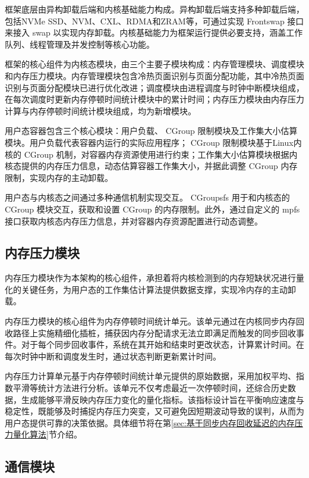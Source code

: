 框架底层由异构卸载后端和内核基础能力构成。异构卸载后端支持多种卸载后端，包括NVMe SSD、NVM、CXL、RDMA和ZRAM等，可通过实现 Frontswap 接口来接入 swap 以实现内存卸载。内核基础能力为框架运行提供必要支持，涵盖工作队列、线程管理及并发控制等核心功能。

框架的核心组件为内核态模块，由三个主要子模块构成：内存管理模块、调度模块和内存压力模块。内存管理模块包含冷热页面识别与页面分配功能，其中冷热页面识别与页面分配模块已进行优化改进；调度模块由进程调度与时钟中断模块组成，在每次调度时更新内存停顿时间统计模块中的累计时间；内存压力模块由内存压力计算与内存停顿时间统计模块组成，均为新增模块。

用户态容器包含三个核心模块：用户负载、 CGroup 限制模块及工作集大小估算模块。用户负载代表容器内运行的实际应用程序； CGroup 限制模块基于Linux内核的 CGroup 机制，对容器内存资源使用进行约束；工作集大小估算模块根据内核态提供的内存压力信息，动态估算容器工作集大小，并据此调整 CGroup 内存限制，实现内存的主动卸载。

用户态与内核态之间通过多种通信机制实现交互。 CGroupsfs 用于和内核态的 CGroup 模块交互，获取和设置 CGroup 的内存限制。此外，通过自定义的 mpfs 接口获取内核态内存压力信息，并对容器内存资源配置进行动态调整。

\subsection{内存压力模块}

内存压力模块作为本架构的核心组件，承担着将内核检测到的内存短缺状况进行量化的关键任务，为用户态的工作集估计算法提供数据支撑，实现冷内存的主动卸载。

内存压力模块的核心组件为内存停顿时间统计单元。该单元通过在内核同步内存回收路径上实施精细化插桩，捕获因内存分配请求无法立即满足而触发的同步回收事件。对于每个同步回收事件，系统在其开始和结束时更改状态，计算累计时间。在每次时钟中断和调度发生时，通过状态判断更新累计时间。

内存压力计算单元基于内存停顿时间统计单元提供的原始数据，采用加权平均、指数平滑等统计方法进行分析。该单元不仅考虑最近一次停顿时间，还综合历史数据，生成能够平滑反映内存压力变化的量化指标。该指标设计旨在平衡响应速度与稳定性，既能够及时捕捉内存压力突变，又可避免因短期波动导致的误判，从而为用户态提供可靠的决策依据。具体细节将在第\ref{sec:基于同步内存回收延迟的内存压力量化算法}节介绍。

\subsection{通信模块}

